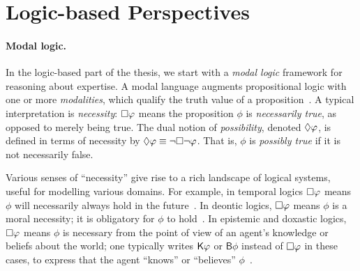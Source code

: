 \section{Logic-based Perspectives}
\label{intro_sec_logic_based_perspectives}

\paragraph{Modal logic.}

{



In the logic-based part of the thesis, we start with a \emph{modal logic}
framework for reasoning about expertise. A modal language augments
propositional logic with one or more \emph{modalities}, which qualify
the truth value of a proposition~\cite{seplogicmodal}. A typical interpretation
is \emph{necessity}: $\Box\varphi$ means the proposition $\phi$ is
\emph{necessarily true}, as opposed to merely being true. The dual notion of
\emph{possibility}, denoted $\Diamond\varphi$, is defined in terms of necessity
by $\Diamond\varphi \equiv \neg\Box\neg\varphi$. That is, $\phi$ is
\emph{possibly true} if it is not necessarily false.

Various senses of ``necessity'' give rise to a rich landscape of logical
systems, useful for modelling various domains. For example, in temporal logics
$\Box\varphi$ means $\phi$ will necessarily always hold in the
future~\cite{goranko_temporal}. In deontic logics, $\Box\varphi$ means $\phi$
is a moral necessity; it is obligatory for $\phi$ to
hold~\cite{mcnama_deontic}. In epistemic and doxastic logics, $\Box\varphi$
means $\phi$ is necessary from the point of view of an agent's knowledge or
beliefs about the world; one typically writes $\mathsf{K}\varphi$ or $\mathsf{B}\phi$
instead of $\Box\varphi$ in these cases, to express that the agent ``knows''
or ``believes'' $\phi$~\cite{rendsvig_epistemic}.

}
